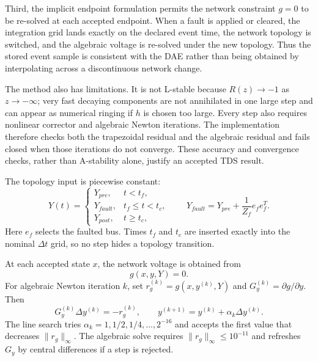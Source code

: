 \documentclass[12pt,a4paper]{article}
\begin{document}
Third, the implicit endpoint formulation permits the network constraint
$g=0$ to be re-solved at each accepted endpoint.  When a fault is applied or
cleared, the integration grid lands exactly on the declared event time, the
network topology is switched, and the algebraic voltage is re-solved under the
new topology.  Thus the stored event sample is consistent with the DAE rather
than being obtained by interpolating across a discontinuous network change.

The method also has limitations.  It is not L-stable because
$R(z)\rightarrow-1$ as $z\rightarrow-\infty$; very fast decaying components
are not annihilated in one large step and can appear as numerical ringing if
$h$ is chosen too large.  Every step also requires nonlinear corrector and
algebraic Newton iterations.  The implementation therefore checks both the
trapezoidal residual and the algebraic residual and fails closed when those
iterations do not converge.  These accuracy and convergence checks, rather
than A-stability alone, justify an accepted TDS result.

The topology input is piecewise constant:
\begin{equation}
Y(t)=
\begin{cases}
Y_{pre},&t<t_f,\\
Y_{fault},&t_f\le t<t_c,\\
Y_{post},&t\ge t_c,
\end{cases}
\qquad
Y_{fault}=Y_{pre}+\frac{1}{Z_f}e_fe_f^T.
\label{eq:ts-topology}
\end{equation}
Here $e_f$ selects the faulted bus. Times $t_f$ and $t_c$ are inserted exactly
into the nominal $\Delta t$ grid, so no step hides a topology transition.

At each accepted state $x$, the network voltage is obtained from
\begin{equation}
g(x,y,Y)=0.
\label{eq:ts-algebraic}
\end{equation}
For algebraic Newton iteration $k$, set
$r_g^{(k)}=g(x,y^{(k)},Y)$ and $G_y^{(k)}=\partial g/\partial y$. Then
\begin{equation}
G_y^{(k)}\Delta y^{(k)}=-r_g^{(k)},\qquad
y^{(k+1)}=y^{(k)}+\alpha_k\Delta y^{(k)}.
\label{eq:ts-network-newton}
\end{equation}
The line search tries $\alpha_k=1,1/2,1/4,\ldots,2^{-16}$ and accepts the
first value that decreases $\|r_g\|_\infty$. The algebraic solve requires
$\|r_g\|_\infty\le10^{-11}$ and refreshes $G_y$ by central differences if
a step is rejected.
\end{document}
